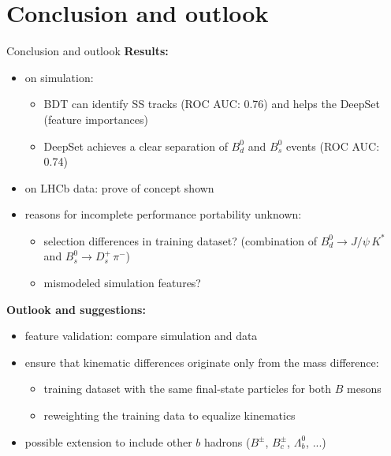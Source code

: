 \documentclass[aspectratio=1610, 10pt]{beamer}
\begin{document}
\section*{Conclusion and outlook}

\begin{frame}{Conclusion and outlook}
  \textbf{Results:}
  \begin{itemize}
    \item on simulation:
    \begin{itemize}
      \item BDT can identify SS tracks (ROC AUC: 0.76) and helps the DeepSet (feature importances)
      \item DeepSet achieves a clear separation of $B^0_d$ and $B^0_s$ events (ROC AUC: 0.74)
    \end{itemize}
    \item on LHCb data: prove of concept shown
    \item reasons for incomplete performance portability unknown:
    \begin{itemize}
      \item selection differences in training dataset? (combination of $B^0_d \rightarrow J/\psi \, K^*$ and $B^0_s \rightarrow D_s^+ \, \pi^-$)
      \item mismodeled simulation features?
    \end{itemize}
  \end{itemize}
  
  \pause
  \medskip
  \textbf{Outlook and suggestions:}
  \begin{itemize}
    \item feature validation: compare simulation and data
    \item ensure that kinematic differences originate only from the mass difference:
    \begin{itemize}
      \item training dataset with the same final-state particles for both $B$ mesons
      \item reweighting the training data to equalize kinematics
    \end{itemize}
    \item possible extension to include other $b$ hadrons ($B^\pm$, $B^\pm_c$, $\Lambda_b^0$, ...)
  \end{itemize}
\end{frame}

\appendix
\end{document}
